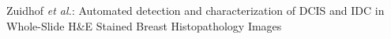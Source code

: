 \documentclass[journal]{IEEEtran}
\begin{document}
% 
%



%
{Zuidhof \MakeLowercase{\textit{et al.}}: Automated detection and characterization of DCIS and IDC in Whole-Slide H\&E Stained Breast Histopathology Images}
% 











\maketitle
\end{document}
